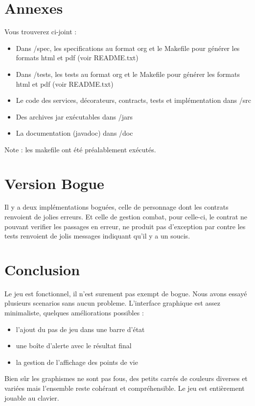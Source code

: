 \documentclass[a4paper,titlepage,openany,12pt]{report}
\begin{document}
\section*{Annexes}

Vous trouverez ci-joint :
\begin{itemize}
\item Dans /spec, les specifications au format org et le Makefile pour générer les formats html et pdf (voir README.txt)
\item Dans /tests, les tests au format org et le Makefile pour générer les formats html et pdf (voir README.txt)
\item Le code des services, décorateurs, contracts, tests et implémentation dans /src
\item Des archives jar exécutables dans /jars
\item La documentation (javadoc) dans /doc
\end{itemize}
Note : les makefile ont été préalablement exécutés.

\section*{Version Bogue}
\paragraph{}
Il y a deux implémentations boguées, celle de personnage dont les
contrats renvoient de jolies erreurs.
Et celle de gestion combat, pour celle-ci, le contrat ne pouvant
verifier les passages en erreur, ne produit pas d'exception par contre
les tests renvoient de jolis messages indiquant qu'il y a un soucis.



\section*{Conclusion}

\paragraph{}
Le jeu est fonctionnel, il n'est surement pas exempt de bogue. Nous
avons essayé plusieurs scenarios sans aucun probleme. L'interface
graphique est assez minimaliste, quelques améliorations possibles :
\begin{itemize}
\item l'ajout du pas de jeu dans une barre d'état
\item une boîte d'alerte avec le résultat final
\item la gestion de l'affichage des points de vie
\end{itemize}
Bien sûr les graphismes ne sont pas fous, des petits carrés de couleurs
diverses et variées mais l'ensemble reste cohérant et compréhensible.
Le jeu est entièrement jouable au clavier.
\end{document}
